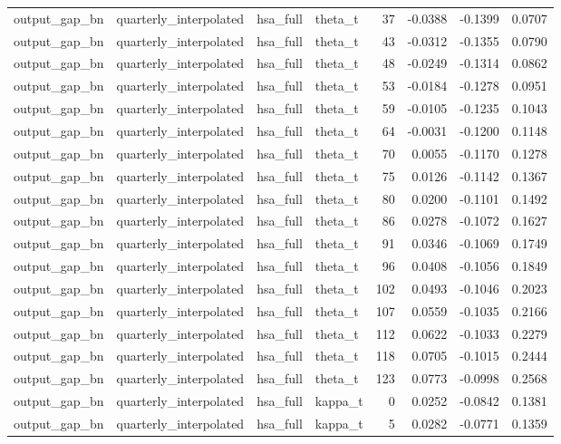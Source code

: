 \begin{tabular}{llllrrrr}
output\_gap\_bn & quarterly\_interpolated & hsa\_full & theta\_t & 37 & -0.0388 & -0.1399 & 0.0707 \\
output\_gap\_bn & quarterly\_interpolated & hsa\_full & theta\_t & 43 & -0.0312 & -0.1355 & 0.0790 \\
output\_gap\_bn & quarterly\_interpolated & hsa\_full & theta\_t & 48 & -0.0249 & -0.1314 & 0.0862 \\
output\_gap\_bn & quarterly\_interpolated & hsa\_full & theta\_t & 53 & -0.0184 & -0.1278 & 0.0951 \\
output\_gap\_bn & quarterly\_interpolated & hsa\_full & theta\_t & 59 & -0.0105 & -0.1235 & 0.1043 \\
output\_gap\_bn & quarterly\_interpolated & hsa\_full & theta\_t & 64 & -0.0031 & -0.1200 & 0.1148 \\
output\_gap\_bn & quarterly\_interpolated & hsa\_full & theta\_t & 70 & 0.0055 & -0.1170 & 0.1278 \\
output\_gap\_bn & quarterly\_interpolated & hsa\_full & theta\_t & 75 & 0.0126 & -0.1142 & 0.1367 \\
output\_gap\_bn & quarterly\_interpolated & hsa\_full & theta\_t & 80 & 0.0200 & -0.1101 & 0.1492 \\
output\_gap\_bn & quarterly\_interpolated & hsa\_full & theta\_t & 86 & 0.0278 & -0.1072 & 0.1627 \\
output\_gap\_bn & quarterly\_interpolated & hsa\_full & theta\_t & 91 & 0.0346 & -0.1069 & 0.1749 \\
output\_gap\_bn & quarterly\_interpolated & hsa\_full & theta\_t & 96 & 0.0408 & -0.1056 & 0.1849 \\
output\_gap\_bn & quarterly\_interpolated & hsa\_full & theta\_t & 102 & 0.0493 & -0.1046 & 0.2023 \\
output\_gap\_bn & quarterly\_interpolated & hsa\_full & theta\_t & 107 & 0.0559 & -0.1035 & 0.2166 \\
output\_gap\_bn & quarterly\_interpolated & hsa\_full & theta\_t & 112 & 0.0622 & -0.1033 & 0.2279 \\
output\_gap\_bn & quarterly\_interpolated & hsa\_full & theta\_t & 118 & 0.0705 & -0.1015 & 0.2444 \\
output\_gap\_bn & quarterly\_interpolated & hsa\_full & theta\_t & 123 & 0.0773 & -0.0998 & 0.2568 \\
output\_gap\_bn & quarterly\_interpolated & hsa\_full & kappa\_t & 0 & 0.0252 & -0.0842 & 0.1381 \\
output\_gap\_bn & quarterly\_interpolated & hsa\_full & kappa\_t & 5 & 0.0282 & -0.0771 & 0.1359 \\

\end{tabular}
